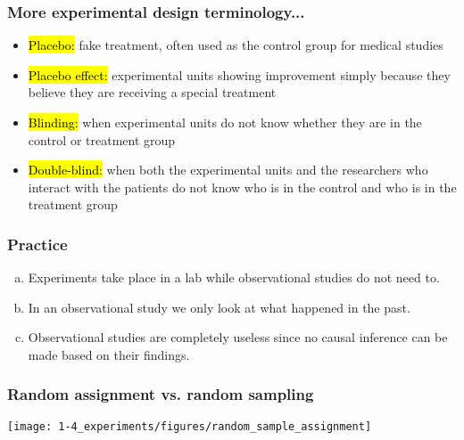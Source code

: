 \begin{frame}
\frametitle{More experimental design terminology...}

\begin{itemize}

\item \hl{Placebo:} fake treatment, often used as the control group for medical studies

\item \hl{Placebo effect:} experimental units showing improvement simply because they believe they are receiving a special treatment

\item \hl{Blinding:} when experimental units do not know whether they are in the control or treatment group

\item \hl{Double-blind:} when both the experimental units and the researchers who interact with the patients do not know who is in the control and who is in the treatment group

\end{itemize}

\end{frame}


\begin{frame}
\frametitle{Practice}


\begin{enumerate}[(a)]
\item Experiments take place in a lab while observational studies do not need to.
\item In an observational study we only look at what happened in the past.
\item Observational studies are completely useless since no causal inference can be made based on their findings.
\end{enumerate}

\end{frame}


\begin{frame}
\frametitle{Random assignment vs. random sampling}

\begin{center}
\texttt{[image: 1-4\_experiments/figures/random\_sample\_assignment]}
\end{center}

\end{frame}

